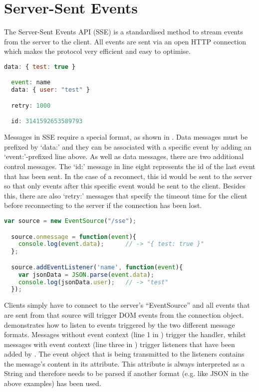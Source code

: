 \section{Server-Sent Events}
\label{realtime-sse}

The Server-Sent Events API (SSE) is a standardised method to stream events from the server to the client. All events are sent via an open HTTP connection which makes the protocol very efficient and easy to optimise. \cite{hickson2012}

\begin{lstlisting}[language=JavaScript, caption=Messages in the Server-Sent Event protocol, label=lst:eventsource]
  data: { test: true }

  event: name
  data: { user: "test" }

  retry: 1000

  id: 3141592653589793
\end{lstlisting}

Messages in SSE require a special format, as shown in . Data messages must be prefixed by `data:' and they can be associated with a specific event by adding an `event:'-prefixed line above. As well as data messages, there are two additional control messages. The `id:' message in line eight represents the id of the last event that has been sent. In the case of a reconnect, this id would be sent to the server so that only events after this specific event would be sent to the client. Besides this, there are also `retry:' messages that specify the timeout time for the client before reconnecting to the server if the connection has been lost. \cite{bidelman2010sse}

\begin{lstlisting}[language=JavaScript, caption=Listening to server events in SSE, label=lst:eventsource-client]
  var source = new EventSource("/sse");

  source.onmessage = function(event){
    console.log(event.data);      // -> "{ test: true }"
  };

  source.addEventListener('name', function(event){
    var jsonData = JSON.parse(event.data);
    console.log(jsonData.user);   // -> "test"
  });
\end{lstlisting}

Clients simply have to connect to the server's ``EventSource'' and all events that are sent from that source will trigger DOM events from the connection object.  demonstrates how to listen to events triggered by the two different message formats. Messages without event context (line 1 in ) trigger the  handler, whilst messages with event context (line three in ) trigger listeners that have been added by . The event object that is being transmitted to the listeners contains the message's content in its  attribute. This attribute is always interpreted as a String and therefore needs to be parsed if another format (e.g. like JSON in the above examples) has been used.